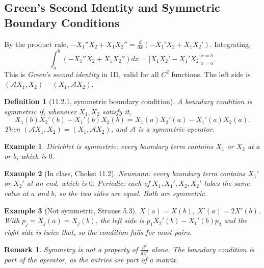 \documentclass{article}
\newtheorem{definition}{Definition}
\newtheorem*{example}{Example}
\newtheorem{remark}{Remark}
\begin{document}
\subsection{Green's Second Identity and Symmetric Boundary Conditions}
By the product rule, $-X_1''X_2 + X_1X_2'' = \frac{d}{dx}\left(-X_1'X_2 + X_1X_2'\right)$. Integrating,
\begin{equation}\label{eq:green2}
    \int_a^b\left(-X_1''X_2 + X_1X_2''\right)dx = \Big[X_1X_2' - X_1'X_2\Big]_{x=a}^{x=b}.
\end{equation}
This is \emph{Green's second identity} in 1D, valid for all $C^2$ functions. The left side is $(\mathcal{A}X_1, X_2) - (X_1, \mathcal{A}X_2)$.
\begin{definition}[11.2.1, symmetric boundary condition]
    A boundary condition is symmetric if, whenever $X_1, X_2$ satisfy it,
    \begin{equation}
        X_1(b)X_2'(b) - X_1'(b)X_2(b) = X_1(a)X_2'(a) - X_1'(a)X_2(a).
    \end{equation}
    Then $(\mathcal{A}X_1, X_2) = (X_1, \mathcal{A}X_2)$, and $\mathcal{A}$ is a symmetric operator.
\end{definition}
\begin{example}
    Dirichlet is symmetric: every boundary term contains $X_1$ or $X_2$ at $a$ or $b$, which is $0$.
\end{example}
\begin{example}[In class, Choksi 11.2]
    Neumann: every boundary term contains $X_1'$ or $X_2'$ at an end, which is $0$. Periodic: each of $X_1, X_1', X_2, X_2'$ takes the same value at $a$ and $b$, so the two sides are equal. Both are symmetric.
\end{example}
\begin{example}[Not symmetric, Strauss 5.3]
    $X(a) = X(b)$, $X'(a) = 2X'(b)$. With $p_j = X_j(a) = X_j(b)$, the left side is $p_1X_2'(b) - X_1'(b)p_2$ and the right side is twice that, so the condition fails for most pairs.
\end{example}
\begin{remark}
    Symmetry is not a property of $\frac{d^2}{dx^2}$ alone. The boundary condition is part of the operator, as the entries are part of a matrix.
\end{remark}
\end{document}
